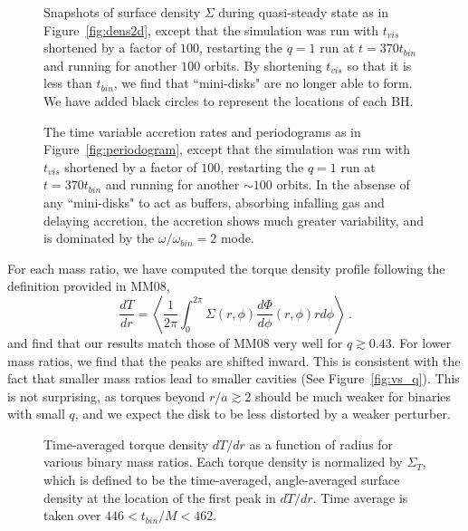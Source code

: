 \documentclass[apj]{emulateapj}
\begin{document}
\begin{figure}
\caption{Snapshots of surface density $\Sigma$ during quasi-steady state as in Figure~\ref{fig:dens2d}, except that the simulation was run with $t_{vis}$ shortened by a factor of $100$, restarting the $q=1$ run at $t=370 t_{bin}$ and running for another $100$ orbits. By shortening $t_{vis}$ so that it is less than $t_{bin}$, we find that ``mini-disks" are no longer able to form. We have added black circles to represent the locations of each BH.}
\label{fig:density2d_small_tvis}
\end{figure}

\begin{figure}
\caption{The time variable accretion rates and periodograms as in Figure~\ref{fig:periodogram}, except that the simulation was run with $t_{vis}$ shortened by a factor of $100$, restarting the $q=1$ run at $t=370 t_{bin}$ and running for another $\sim 100$ orbits. In the absense of any ``mini-disks" to act as buffers, absorbing infalling gas and delaying accretion, the accretion shows much greater variability, and is dominated by the $\omega / \omega_{bin} = 2$ mode.}
\label{fig:periodogram_small_tvis}
\end{figure}

For each mass ratio, we have computed the torque density profile following the definition provided in MM08,
\begin{equation}
\frac{dT}{dr} = \left\langle \frac{1}{2 \pi} \int_0^{2\pi} \Sigma(r,\phi)\frac{d\Phi}{d\phi}(r,\phi) r d\phi \right\rangle \ .
\end{equation}
and find that our results match those of MM08 very well for $q \gtrsim 0.43$. For lower mass ratios, we find that the peaks are shifted inward. This is consistent with the fact that smaller mass ratios lead to smaller cavities (See Figure~\ref{fig:vs_q}). This is not surprising, as torques beyond $r/a \gtrsim 2$ should be much weaker for binaries with small $q$, and we expect the disk to be less distorted by a weaker perturber.
\begin{figure}
\caption{Time-averaged torque density $dT/dr$ as a function of radius for various binary mass ratios. Each torque density is normalized by $\Sigma_T$, which is defined to be the time-averaged, angle-averaged surface density at the location of the first peak in $dT/dr$. Time average is taken over $446 < t_{bin}/M < 462$.}
\end{figure}
\label{fig:torque}
\end{document}
